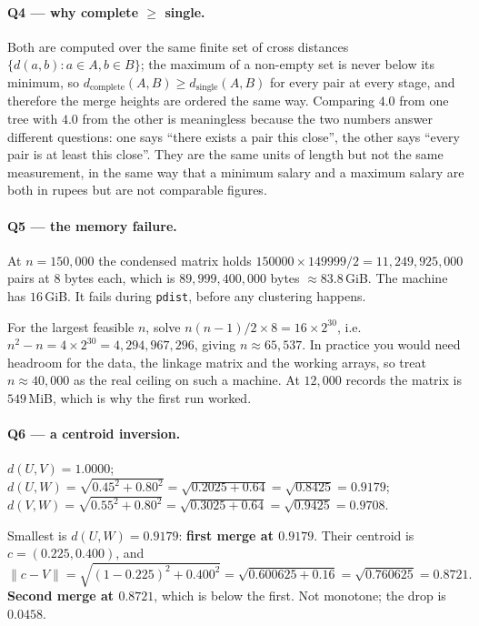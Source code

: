 \documentclass[11pt]{article}
\begin{document}
\paragraph{Q4 --- why complete $\ge$ single.}
Both are computed over the same finite set of cross distances
$\{d(a,b) : a \in A, b \in B\}$; the maximum of a non-empty set is never below
its minimum, so $d_{\text{complete}}(A,B) \ge d_{\text{single}}(A,B)$ for
every pair at every stage, and therefore the merge heights are ordered the
same way. Comparing $4.0$ from one tree with $4.0$ from the other is
meaningless because the two numbers answer different questions: one says
``there exists a pair this close'', the other says ``every pair is at least
this close''. They are the same units of length but not the same measurement,
in the same way that a minimum salary and a maximum salary are both in rupees
but are not comparable figures.

\paragraph{Q5 --- the memory failure.}
At $n = 150{,}000$ the condensed matrix holds $150000 \times 149999 / 2 =
11{,}249{,}925{,}000$ pairs at $8$ bytes each, which is $89{,}999{,}400{,}000$
bytes $\approx 83.8$\,GiB. The machine has $16$\,GiB. It fails during
\texttt{pdist}, before any clustering happens.

For the largest feasible $n$, solve $n(n-1)/2 \times 8 = 16 \times 2^{30}$,
i.e.\ $n^2 - n = 4 \times 2^{30} = 4{,}294{,}967{,}296$, giving
$n \approx 65{,}537$. In practice you would need headroom for the data, the
linkage matrix and the working arrays, so treat $n \approx 40{,}000$ as the
real ceiling on such a machine. At $12{,}000$ records the matrix is
$549$\,MiB, which is why the first run worked.

\paragraph{Q6 --- a centroid inversion.}
$d(U,V) = 1.0000$; $d(U,W) = \sqrt{0.45^2 + 0.80^2} = \sqrt{0.2025 + 0.64} =
\sqrt{0.8425} = 0.9179$; $d(V,W) = \sqrt{0.55^2 + 0.80^2} =
\sqrt{0.3025 + 0.64} = \sqrt{0.9425} = 0.9708$.

Smallest is $d(U,W) = 0.9179$: \textbf{first merge at $0.9179$}. Their
centroid is $c = (0.225, 0.400)$, and
\[
  \lVert c - V \rVert = \sqrt{(1 - 0.225)^2 + 0.400^2}
  = \sqrt{0.600625 + 0.16} = \sqrt{0.760625} = 0.8721 .
\]
\textbf{Second merge at $0.8721$}, which is below the first. Not monotone; the
drop is $0.0458$.
\end{document}
